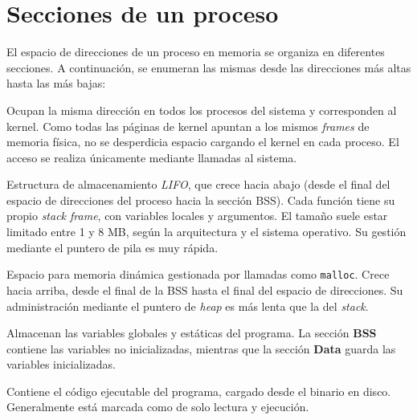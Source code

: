 \section{Secciones de un proceso}

El espacio de direcciones de un proceso en memoria se organiza en diferentes secciones.
A continuación, se enumeran las mismas desde las direcciones más altas hasta las más bajas:

\begin{description}[style=nextline, leftmargin=2cm]

    \item[\textbf{Páginas del Kernel}]  
    Ocupan la misma dirección en todos los procesos del sistema y corresponden al kernel.  
    Como todas las páginas de kernel apuntan a los mismos \textit{frames} de memoria física, 
    no se desperdicia espacio cargando el kernel en cada proceso.  
    El acceso se realiza únicamente mediante llamadas al sistema.

    \item[\textbf{Stack (lectura y escritura)}]  
    Estructura de almacenamiento \textit{LIFO}, que crece hacia abajo 
    (desde el final del espacio de direcciones del proceso hacia la sección BSS).  
    Cada función tiene su propio \textit{stack frame}, con variables locales y argumentos.  
    El tamaño suele estar limitado entre 1 y 8 MB, según la arquitectura y el sistema operativo.  
    Su gestión mediante el puntero de pila es muy rápida.

    \item[\textbf{Heap (lectura y escritura)}]  
    Espacio para memoria dinámica gestionada por llamadas como \texttt{malloc}.  
    Crece hacia arriba, desde el final de la BSS hasta el final del espacio de direcciones.  
    Su administración mediante el puntero de \textit{heap} es más lenta que la del \textit{stack}.

    \item[\textbf{BSS y Data (lectura y escritura)}]  
    Almacenan las variables globales y estáticas del programa.  
    La sección \textbf{BSS} contiene las variables no inicializadas,  
    mientras que la sección \textbf{Data} guarda las variables inicializadas.

    \item[\textbf{Text (lectura y ejecución)}]  
    Contiene el código ejecutable del programa, cargado desde el binario en disco.  
    Generalmente está marcada como de solo lectura y ejecución.

\end{description}
